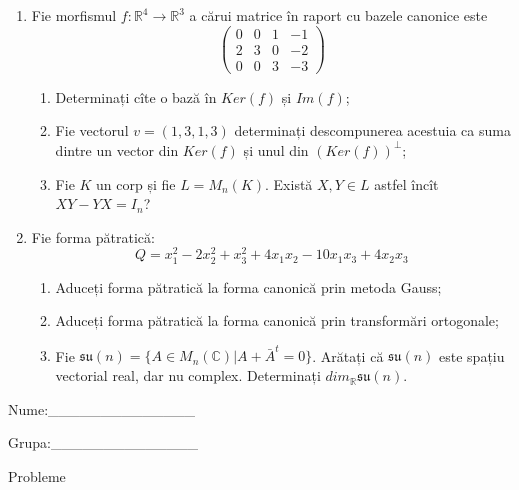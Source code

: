 \documentclass{article}
\begin{document}
\begin{enumerate}
 \item Fie morfismul $f:\mathbb{R}^4 \to \mathbb{R}^3$ a cărui matrice în raport cu bazele canonice este
$$\begin{pmatrix}
0&0&1&-1\\
2&3&0&-2\\
0&0&3&-3
\end{pmatrix}$$

\begin{enumerate}
\item Determinați cîte o bază în $Ker(f)$ și $Im(f)$;
\item Fie vectorul $v=(1,3,1,3)$ determinați descompunerea acestuia ca suma dintre un vector din $Ker(f)$ și unul din $(Ker(f))^\perp$;
\item Fie $K$ un corp și fie $L=M_n(K)$. Există $X,Y \in L$ astfel încît $XY-YX=I_n$?  
\end{enumerate}
\item Fie forma pătratică:
$$Q= x_1^2-2x_2^2+x_3^2+4x_1x_2-10x_1x_3+4x_2x_3$$

\begin{enumerate}
\item Aduceți forma pătratică la forma canonică prin metoda Gauss;
\item Aduceți forma pătratică la forma canonică prin transformări ortogonale;
\item Fie $\mathfrak{su}(n)=\{ A \in M_n(\mathbb{C}) | A+\bar{A}^t=0\}$. Arătați că $\mathfrak{su}(n)$ este spațiu vectorial real, dar nu complex.
Determinați $dim_{\mathbb{R}}\mathfrak{su}(n)$.
\end{enumerate}
\end{enumerate}
\newpage
\begin{flushright}
Nume:\_\_\_\_\_\_\_\_\_\_\_\_\_\_
 
 
Grupa:\_\_\_\_\_\_\_\_\_\_\_\_\_\_
\end{flushright}
\begin{center}
\vspace{2cm}
{\Large Probleme}
\vspace{2cm}
\end{center}
\end{document}
